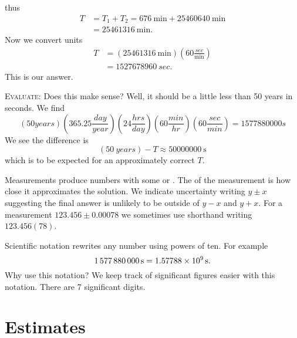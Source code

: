 thus
\begin{equation}
\begin{split}
T &= T_1+T_2 = \SI{676}{\minute} + \SI{25460640}{\minute}\\
&=\SI{25461316}{\minute}.
\end{split}
\end{equation}
Now we convert units
\begin{equation}
\begin{split}
T &= (\SI{25461316}{\minute})\left(60\frac{\si{sec}}{\si{\minute}}\right)\\
&=\SI{1527678960}{sec}.
\end{split}
\end{equation}
This is our answer.

\textsc{Evaluate:}
Does this make sense? Well, it should be a little less than 50
years in seconds. We find
\begin{equation}
\!(50\si{years})
\!\!\left(365.25\frac{\si{day}}{\si{year}}\right)
\!\!\left(24\frac{\si{hrs}}{\si{day}}\right)
\!\!\left(60\frac{\si{min}}{\si{hr}}\right)
\!\!\left(60\frac{\si{sec}}{\si{min}}\right)
=1577880000\si{s}
\end{equation}
We see the difference is
\begin{equation}
(\SI{50}{years})-T\approx \SI{50000000}{\second}
\end{equation}
which is to be expected for an approximately correct $T$.

Measurements produce numbers with
some 
or . The  of the measurement is
how close it approximates the solution. We indicate uncertainty
writing $y\pm x$ suggesting the final answer is unlikely to be
outside of $y-x$ and $y+x$. For a measurement $123.456\pm0.00078$
we sometimes use shorthand writing $123.456(78)$.

Scientific notation rewrites any number using powers of ten.
For example
\begin{equation}
\SI{1577880000}{\second}
=\SI[parse-numbers = false]{1.57788\times10^{9}}{\second}.
\end{equation}
Why use this notation? We keep track of significant figures
easier with this notation. There are 7 significant digits.

\section{Estimates}

